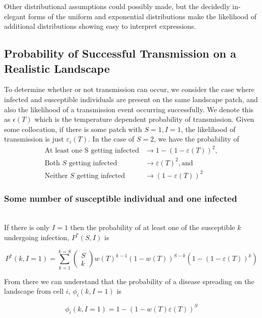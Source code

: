 Other distributional assumptions could possibly made, but the decidedly in-elegant forms of the uniform and exponential distributions make the likelihood of additional distributions showing easy to interpret expressions.

\subsection{Probability of Successful Transmission on a Realistic Landscape}

To determine whether or not transmission can occur, we consider the case where infected and susceptible individuals are present on the same landscape patch, and also the likelihood of a transmission event occurring successfully. We denote this as $\epsilon(T)$ which is the temperature dependent probability of transmission.  Given some collocation, if there is some patch with $S = 1, I = 1$, the likelihood of transmission is just $\varepsilon_{i}(T)$. In the case of $S = 2$, we have the probability of 
\begin{align}
    \text{At least one S getting infected} &\rightarrow 1 - (1- \varepsilon(T))^2, \\
    \text{Both } S \text{ getting infected} &\rightarrow \varepsilon(T)^2, \text{and} \\
    \text{Neither } S \text{ getting infected} &\rightarrow (1 - \varepsilon(T))^2
\end{align}

\subsubsection{Some number of susceptible individual and one infected} \\

If there is only $I = 1$ then the probability of at least one of the susceptible $k$ undergoing infection, $P^*(S, I)$ is

\begin{equation}
    P^*(k, I=1) = \sum^{k=S}_{k = 1}\begin{pmatrix} S\\ k \end{pmatrix} w(T)^{k-1}(1-w(T))^{S-k}(1 - (1-\varepsilon(T))^k)
\end{equation}

From there we can understand that the probability of a disease spreading on the landscape from cell $i$, $\phi_{i}(k, I = 1)$ is 

\begin{equation}
    \phi_{i}(k, I = 1) = 1 - (1 - w(T) \varepsilon(T))^S
\end{equation}


